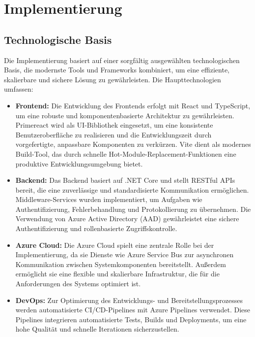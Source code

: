 \chapter{Implementierung}
\label{chap:implementierung}

\section{Technologische Basis}
Die Implementierung basiert auf einer sorgfältig ausgewählten technologischen Basis, die modernste Tools und Frameworks kombiniert, um eine effiziente, skalierbare und sichere Lösung zu gewährleisten. Die Haupttechnologien umfassen:

\begin{itemize}
    \item \textbf{Frontend:} Die Entwicklung des Frontends erfolgt mit React und TypeScript, um eine robuste und komponentenbasierte Architektur zu gewährleisten. Primereact wird als UI-Bibliothek eingesetzt, um eine konsistente Benutzeroberfläche zu realisieren und die Entwicklungszeit durch vorgefertigte, anpassbare Komponenten zu verkürzen. Vite dient als modernes Build-Tool, das durch schnelle Hot-Module-Replacement-Funktionen eine produktive Entwicklungsumgebung bietet.
    
    \item \textbf{Backend:} Das Backend basiert auf .NET Core und stellt RESTful APIs bereit, die eine zuverlässige und standardisierte Kommunikation ermöglichen. Middleware-Services wurden implementiert, um Aufgaben wie Authentifizierung, Fehlerbehandlung und Protokollierung zu übernehmen. Die Verwendung von Azure Active Directory (AAD) gewährleistet eine sichere Authentifizierung und rollenbasierte Zugriffskontrolle.
    
    \item \textbf{Azure Cloud:} Die Azure Cloud spielt eine zentrale Rolle bei der Implementierung, da sie Dienste wie Azure Service Bus zur asynchronen Kommunikation zwischen Systemkomponenten bereitstellt. Außerdem ermöglicht sie eine flexible und skalierbare Infrastruktur, die für die Anforderungen des Systems optimiert ist.
    
    \item \textbf{DevOps:} Zur Optimierung des Entwicklungs- und Bereitstellungsprozesses werden automatisierte CI/CD-Pipelines mit Azure Pipelines verwendet. Diese Pipelines integrieren automatisierte Tests, Builds und Deployments, um eine hohe Qualität und schnelle Iterationen sicherzustellen.
    

\end{itemize}

